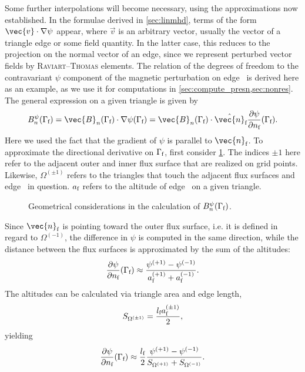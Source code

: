 Some further interpolations will become necessary, using the approximations now established. In the formulae derived in \cref{sec:linmhd}, terms of the form $\vec{v} \cdot \grad \psi$ appear, where $\vec{v}$ is an arbitrary vector, usually the vector of a triangle edge or some field quantity. In the latter case, this reduces to the projection on the normal vector of an edge, since we represent perturbed vector fields by \textsc{Raviart}--\textsc{Thomas} elements. The relation of the degrees of freedom to the contravariant $\psi$ component of the magnetic perturbation on edge \fs\ is derived here as an example, as we use it for computations in \cref{sec:compute_presn,sec:nonres}. The general expression on a given triangle is given by
\begin{gather}
  B_{n}^{\psi} (\Gamma_{\fs}) = \vec{B}_{n} (\Gamma_{\fs}) \cdot \grad \psi (\Gamma_{\fs}) = \vec{B}_{n} (\Gamma_{\fs}) \cdot \hat{\vec{n}}_{\fs} \pd[\psi]{n_{\fs}} (\Gamma_{\fs}).
\end{gather}
Here we used the fact that the gradient of $\psi$ is parallel to $\vec{n}_{\fs}$. To approximate the directional derivative on $\Gamma_{\fs}$, first consider \cref{fig:altitudes}. The indices $\pm 1$ here refer to the adjacent outer and inner flux surface that are realized on grid points. Likewise, $\Omega^{(\pm 1)}$ refers to the triangles that touch the adjacent flux surfaces and edge \fs\ in question. $a_{\fs}$ refers to the altitude of edge \fs\ on a given triangle.
\begin{figure}[bth]
  \centering
  
  \caption{Geometrical considerations in the calculation of $B_{n}^{\psi} (\Gamma_{\fs})$.}
  \label{fig:altitudes}
\end{figure}
Since $\vec{n}_{\fs}$ is pointing toward the outer flux surface, i.e. it is defined in regard to $\Omega^{(-1)}$, the difference in $\psi$ is computed in the same direction, while the distance between the flux surfaces is approximated by the sum of the altitudes:
\begin{gather}
  \pd[\psi]{n_{\fs}} (\Gamma_{\fs}) \approx \frac{\psi^{(+1)} - \psi^{(-1)}}{a_{\fs}^{(+1)} + a_{\fs}^{(-1)}}.
\end{gather}
The altitudes can be calculated via triangle area and edge length,
\begin{gather}
  S_{\Omega^{(\pm 1)}} = \frac{l_{\fs} a_{\fs}^{(\pm 1)}}{2},
\end{gather}
yielding
\begin{gather}
  \pd[\psi]{n_{\fs}} (\Gamma_{\fs}) \approx \frac{l_{\fs}}{2} \frac{\psi^{(+1)} - \psi^{(-1)}}{S_{\Omega^{(+1)}} + S_{\Omega^{(-1)}}}.
\end{gather}

